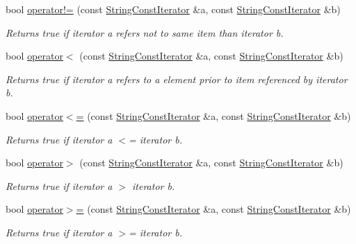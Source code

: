 \begin{DoxyCompactItemize}
bool \hyperlink{struct_mdt_1_1_plain_text_1_1_string_const_iterator_a501d2ca93f0e5ebb68adbbc3a2c51d94}{operator!=} (const \hyperlink{struct_mdt_1_1_plain_text_1_1_string_const_iterator}{String\+Const\+Iterator} \&a, const \hyperlink{struct_mdt_1_1_plain_text_1_1_string_const_iterator}{String\+Const\+Iterator} \&b)
\begin{DoxyCompactList}\small\item\em Returns true if iterator a refers not to same item than iterator b. \end{DoxyCompactList}\item 
bool \hyperlink{struct_mdt_1_1_plain_text_1_1_string_const_iterator_ab6c41706a2c62f0e6517c305311b33f0}{operator$<$} (const \hyperlink{struct_mdt_1_1_plain_text_1_1_string_const_iterator}{String\+Const\+Iterator} \&a, const \hyperlink{struct_mdt_1_1_plain_text_1_1_string_const_iterator}{String\+Const\+Iterator} \&b)
\begin{DoxyCompactList}\small\item\em Returns true if iterator a refers to a element prior to item referenced by iterator b. \end{DoxyCompactList}\item 
bool \hyperlink{struct_mdt_1_1_plain_text_1_1_string_const_iterator_a4873d7ea38532347f34f5972aa869d0d}{operator$<$=} (const \hyperlink{struct_mdt_1_1_plain_text_1_1_string_const_iterator}{String\+Const\+Iterator} \&a, const \hyperlink{struct_mdt_1_1_plain_text_1_1_string_const_iterator}{String\+Const\+Iterator} \&b)
\begin{DoxyCompactList}\small\item\em Returns true if iterator a $<$= iterator b. \end{DoxyCompactList}\item 
bool \hyperlink{struct_mdt_1_1_plain_text_1_1_string_const_iterator_a4ecb4b8bf38c6c9f73cab3376f30ddbc}{operator$>$} (const \hyperlink{struct_mdt_1_1_plain_text_1_1_string_const_iterator}{String\+Const\+Iterator} \&a, const \hyperlink{struct_mdt_1_1_plain_text_1_1_string_const_iterator}{String\+Const\+Iterator} \&b)
\begin{DoxyCompactList}\small\item\em Returns true if iterator a $>$ iterator b. \end{DoxyCompactList}\item 
bool \hyperlink{struct_mdt_1_1_plain_text_1_1_string_const_iterator_aa84a37a77a95607eb3d645a607e50831}{operator$>$=} (const \hyperlink{struct_mdt_1_1_plain_text_1_1_string_const_iterator}{String\+Const\+Iterator} \&a, const \hyperlink{struct_mdt_1_1_plain_text_1_1_string_const_iterator}{String\+Const\+Iterator} \&b)
\begin{DoxyCompactList}\small\item\em Returns true if iterator a $>$= iterator b. \end{DoxyCompactList}\end{DoxyCompactItemize}


